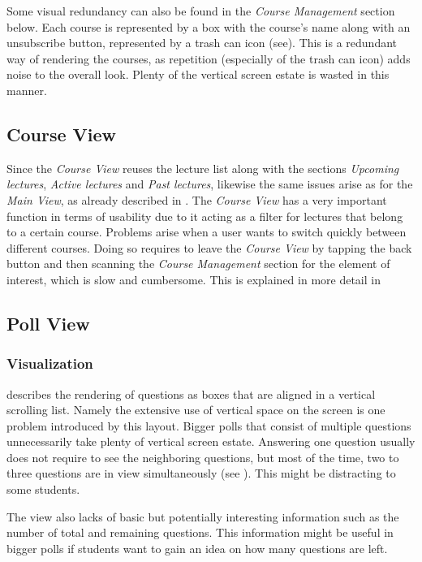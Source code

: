 Some visual redundancy can also be found in the \emph{Course Management} section below. Each course is represented by a box with the course's name along with an unsubscribe button, represented by a trash can icon (see). This is a redundant way of rendering the courses, as repetition (especially of the trash can icon) adds noise to the overall look. Plenty of the vertical screen estate is wasted in this manner.
\subsection{Course View}
\label{section:con:problems:courseview}
Since the \emph{Course View} reuses the lecture list along with the sections \emph{Upcoming lectures}, \emph{Active lectures} and \emph{Past lectures}, likewise the same issues arise as for the \emph{Main View}, as already described in . 
The \emph{Course View} has a very important function in terms of usability due to it acting as a filter for lectures that belong to a certain course. Problems arise when a user wants to switch quickly between different courses. Doing so requires to leave the \emph{Course View} by tapping the back button and then scanning the \emph{Course Management} section for the element of interest, which is slow and cumbersome. This is explained in more detail in 

\subsection{Poll View}

\subsubsection{Visualization}
\label{section:con:problems:pollview}

 describes the rendering of questions as boxes that are aligned in a vertical scrolling list. Namely the extensive use of vertical space on the screen is one problem introduced by this layout. Bigger polls that consist of multiple questions unnecessarily take plenty of vertical screen estate. 
Answering one question usually does not require to see the neighboring questions, but most of the time, two to three questions are in view simultaneously (see ). This might be distracting to some students.

The view also lacks of basic but potentially interesting information such as the number of total and remaining questions. This information might be useful in bigger polls if students want to gain an idea on how many questions are left.

